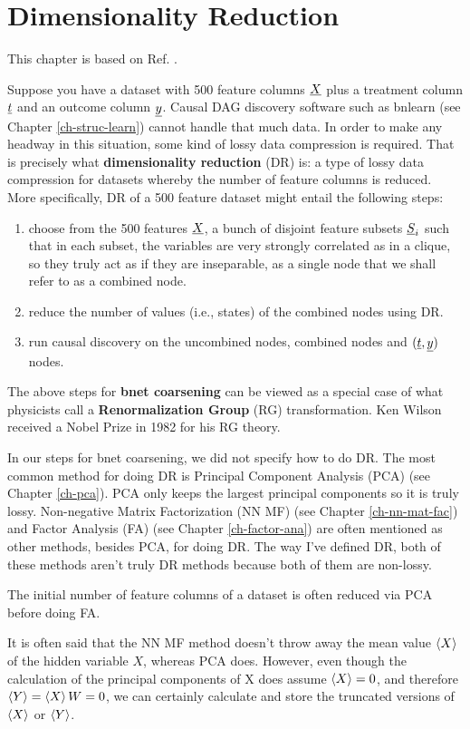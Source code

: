 \chapter{Dimensionality Reduction}
\label{ch-dim-reduc}


This chapter is based on Ref. \cite{wiki-dim-reduc}.


Suppose you have a dataset with 500 feature columns ${\underline{X}}$ plus a treatment
column ${\underline{t}}$ and an outcome column ${\underline{y}}$.
Causal DAG discovery software such as  bnlearn (see Chapter \ref{ch-struc-learn}) 
cannot handle that much data.
In order to make any headway in this situation,
some kind of lossy data compression is required. That is precisely what {\bf dimensionality reduction} (DR) is: a type
of lossy data compression for datasets whereby the number of feature columns is reduced.
More specifically, DR of a 500 feature dataset might entail the 
following steps:
\begin{enumerate}

\item choose from the 500 features ${\underline{X}}$, a bunch of disjoint feature subsets ${\underline{S}}_i$ such that in each subset, the variables are very strongly correlated as in a clique, so they truly act as if they are inseparable, as a single node that we shall refer to as a combined node.

\item reduce the number of values (i.e., states) of the combined nodes using DR.

\item run causal discovery on the uncombined nodes, combined nodes and $({\underline{t}}, {\underline{y}})$
 nodes.
\end{enumerate}

The above steps for {\bf bnet  coarsening} can be
viewed as a special case of what physicists call a {\bf Renormalization Group} (RG) transformation. Ken Wilson received a Nobel Prize in 1982 for his RG theory.

In our steps for bnet coarsening,
we did not specify how to do DR. 
The most common
method for doing DR is
Principal Component Analysis (PCA)
(see Chapter \ref{ch-pca}). PCA 
only keeps the largest principal 
components so it is truly lossy. Non-negative Matrix Factorization (NN MF)
(see Chapter \ref{ch-nn-mat-fac})
and Factor Analysis (FA) (see Chapter \ref{ch-factor-ana})
are often mentioned as other
methods, besides PCA, for doing DR. The way I've
defined DR, both of these methods aren't truly DR methods because both of them are non-lossy.

The initial number of feature columns of a dataset is often reduced via PCA before doing FA.

It is often said that the NN MF method doesn't throw away the mean value $\left\langle X\right\rangle$ of the hidden variable $X$,
whereas PCA does. However, even though the calculation of the principal components of X
does assume $\left\langle X\right\rangle=0$, and therefore $\left\langle Y\right\rangle=\left\langle X\right\rangle W=0$, we can certainly calculate and store the truncated 
versions of $\left\langle X\right\rangle$ or $\left\langle Y\right\rangle$.
